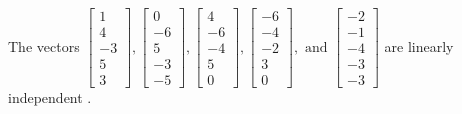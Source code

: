\begin{exercise}
\begin{exerciseStatement}
  \end{exerciseStatement}
  \begin{exerciseAnswer}
   The vectors \(\left[\begin{array}{r}
1 \\
4 \\
-3 \\
5 \\
3
\end{array}\right] , \left[\begin{array}{r}
0 \\
-6 \\
5 \\
-3 \\
-5
\end{array}\right] , \left[\begin{array}{r}
4 \\
-6 \\
-4 \\
5 \\
0
\end{array}\right] , \left[\begin{array}{r}
-6 \\
-4 \\
-2 \\
3 \\
0
\end{array}\right] , \text{ and } \left[\begin{array}{r}
-2 \\
-1 \\
-4 \\
-3 \\
-3
\end{array}\right]\) are 
  	 linearly independent  .
  


  \end{exerciseAnswer}
\end{exercise}